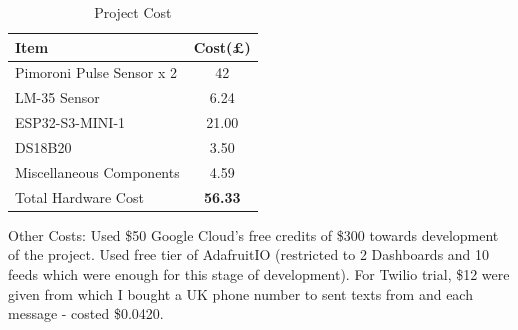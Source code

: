 \begin{table}[h!]
    \centering
    \begin{tabularx}{\textwidth}{|X|c|}
    \hline 
         \textbf{Item}& \textbf{Cost(£)}  \\ \hline
        Pimoroni Pulse Sensor x 2    &  42 \\ 
        LM-35 Sensor & 6.24 \\ 
        ESP32-S3-MINI-1 & 21.00 \\
        DS18B20 & 3.50 \\
        Miscellaneous Components & 4.59 \\ \hline
        Total Hardware Cost & \textbf{56.33} \\ \hline
        
    \end{tabularx}
    \caption{Project Cost}
    \label{tab:project-cost}
\end{table}

Other Costs:
Used \$50 Google Cloud's free credits of \$300 towards development of the project.
Used free tier of AdafruitIO (restricted to 2 Dashboards and 10 feeds which were enough for this stage of development). For Twilio trial, \$12 were given from which I bought a UK phone number to sent texts from and each message - costed \$0.0420. 




